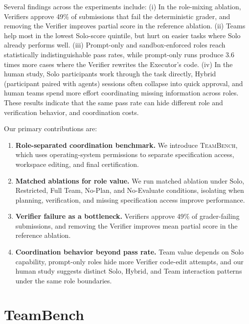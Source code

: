 \documentclass{article}
\begin{document}
Several findings across the experiments include: (i) In the role-mixing ablation, Verifiers approve 49\% of submissions that fail the deterministic grader, and removing the Verifier improves partial score in the reference ablation. (ii) Teams help most in the lowest Solo-score quintile, but hurt on easier tasks where Solo already performs well. (iii) Prompt-only and sandbox-enforced roles reach statistically indistinguishable pass rates, while prompt-only runs produce 3.6 times more cases where the Verifier rewrites the Executor's code. (iv) In the human study, Solo participants work through the task directly, Hybrid (participant paired with agents) sessions often collapse into quick approval, and human teams spend more effort coordinating missing information across roles. These results indicate that the same pass rate can hide different role and verification behavior, and coordination costs.

Our primary contributions are:
\begin{enumerate}[leftmargin=1em,itemsep=1pt,topsep=0pt]
    \item \textbf{Role-separated coordination benchmark.}
    We introduce \textsc{TeamBench}, which uses operating-system permissions to separate
    specification access, workspace editing, and final certification.

    \item \textbf{Matched ablations for role value.}
    We run matched ablation under Solo, Restricted, Full Team, No-Plan, and No-Evaluate
    conditions, isolating when planning, verification, and missing specification access
    improve performance.

    \item \textbf{Verifier failure as a bottleneck.}
    Verifiers approve 49\% of grader-failing submissions, and removing the Verifier
    improves mean partial score in the reference ablation.

    \item \textbf{Coordination behavior beyond pass rate.}
    Team value depends on Solo capability, prompt-only roles hide more Verifier code-edit attempts,
    and our human study suggests distinct Solo, Hybrid, and Team interaction patterns
    under the same role boundaries.
\end{enumerate}

\section{TeamBench}
\label{sec:teambench}
\end{document}
